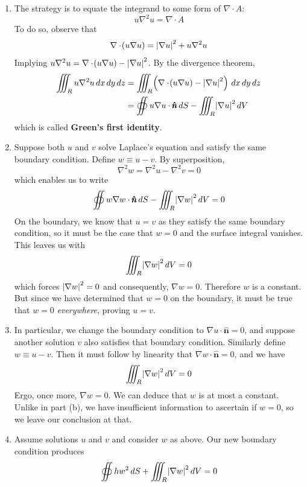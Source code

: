 \documentclass[a4paper]{article}
\begin{document}
\begin{enumerate}[label=(\alph*)]
	\item The strategy is to equate the integrand to some form of \( \nabla \cdot A \):
	\[
		u \nabla^{2}u = \nabla \cdot A 
	\]
	To do so, observe that
	\[
		\nabla \cdot \!\left( u \nabla u \right) = \abs{\nabla u}^{2} + u \nabla^{2}u
	\]
	Implying \( u \nabla^{2}u = \nabla \cdot \!\left( u \nabla u \right) - \abs{\nabla u}^{2} \). By the divergence theorem,
	\begin{align*}
		\iiint_{R} u \nabla^{2}u \, dx \, dy \, dz & = \iiint_{R} \!\left( \nabla \cdot \!\left( u \nabla u \right) - \abs{\nabla u}^{2} \right) \, dx \, dy \, dz \\
		 & = \oiint u \nabla u \cdot \pmb{\hat{n}} \, dS - \iiint_{R} \abs{\nabla u}^{2} \, dV
	\end{align*}
	which is called \textbf{Green's first identity}.
	\item Suppose both \( u \) and \( v \) solve Laplace's equation and satisfy the same boundary condition. Define \( w \equiv u - v \). By superposition,
	\[
		\nabla^{2}w = \nabla^{2}u - \nabla^{2}v = 0 
	\]
	which enables us to write
	\[
		\oiint w \nabla w \cdot \pmb{\hat{n}} \, dS - \iiint_{R} \abs{\nabla w}^{2} \, dV = 0 
	\]
	On the boundary, we know that \( u = v \) as they satisfy the same boundary condition, so it must be the case that \( w = 0 \) and the surface integral vanishes. This leaves us with
	\[
		\iiint_{R} \abs{\nabla w}^{2} \, dV = 0 
	\]
	which forces \( \abs{\nabla w}^{2} = 0 \) and consequently, \( \nabla w = 0 \). Therefore \( w \) is a constant. But since we have determined that \( w = 0 \) on the boundary, it must be true that \( w = 0 \) \textit{everywhere}, proving \( u = v \).
	\item In particular, we change the boundary condition to \( \nabla u \cdot \pmb{\hat{n}} = 0 \), and suppose another solution \( v \) also satisfies that boundary condition. Similarly define \( w \equiv u - v \). Then it must follow by linearity that \( \nabla w \cdot \pmb{\hat{n}} = 0 \), and we have
	\[
		\iiint_{R} \abs{\nabla w}^{2} \, dV = 0 
	\]
	Ergo, once more, \( \nabla w = 0 \). We can deduce that \( w \) is at most a constant. Unlike in part (b), we have insufficient information to ascertain if \( w = 0 \), so we leave our conclusion at that.
	\item Assume solutions \( u \) and \( v \) and consider \( w \) as above. Our new boundary condition produces
	\[
		\oiint hw^{2} \, dS + \iiint_{R} \abs{\nabla w}^{2} \, dV = 0
\]
\end{enumerate}
\end{document}

